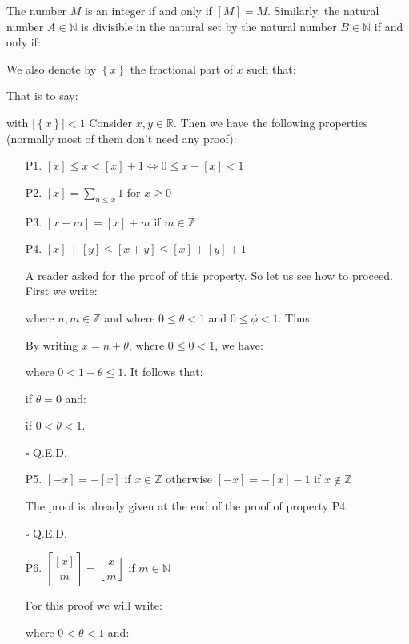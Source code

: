 The number $M$ is an integer if and only if $[M] = M$. Similarly, the natural number $A \in \mathbb{N}$ is divisible in the natural set by the natural number $B \in \mathbb{N}$ if and only if:
	
We also denote by $\left\lbrace x\right\rbrace $ the fractional part of $x$ such that:
	
That is to say:
	
with $\mid \left\lbrace x\right\rbrace \mid < 1$
Consider $x,y \in \mathbb{R}$. Then we have the following properties (normally most of them don't need any proof):
	\begin{enumerate}
		\item[P1.] $[x]\leq x <[x]+1\Leftrightarrow 0\leq x-[x] <1$
		\item[P2.] $[x]=\displaystyle\sum_{n\leq x} 1$ for $x \geq 0$
		\item[P3.] $[x+m]=[x]+m$ if $m \in \mathbb{Z}$
		\item[P4.] $[x]+[y] \leq [x+y] \leq [x]+[y]+1$
		\begin{dem}
			A reader asked for the proof of this property. So let us see how to proceed. First we write:
			
		where $n,m \in \mathbb{Z}$ and where $0 \leq \theta < 1$ and $0 \leq \phi <1$. Thus:
			
			By writing $x=n+\theta$, where $0\leq 0 <1$, we have:
			
			where $0 < 1 -\theta \leq 1$.
			It follows that:
			
			if $\theta = 0$ and:
			
			if $0<\theta<1$.
			\begin{flushright}
				$\square$  Q.E.D.
			\end{flushright}
		\end{dem}
		\item[P5.] $[-x]=-[x]$ if $x \in \mathbb{Z}$ otherwise $[-x]=-[x]-1$ if $x \not\in \mathbb{Z}$
			\begin{dem}
			 The proof is already given at the end of the proof of property P4.
			\begin{flushright}
				$\square$  Q.E.D.
			\end{flushright}		
			\end{dem}
		\item[P6.] $\left[\dfrac{[x]}{m}\right]=\left[\dfrac{x}{m}\right]$ if $m \in \mathbb{N}$ 
			\begin{dem}
				For this proof we will write:
				
				where $0 < \theta <1$
				and:
				

\end{dem}
\end{enumerate}

